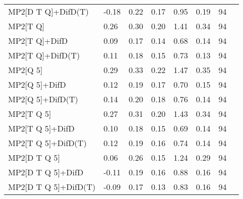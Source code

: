 \begin{table}
\begin{tabular}{l l l l l l l l }
    MP2[D T Q]+DifD(T) & -0.18 & 0.22 & 0.17 & 0.95 & 0.19 & 94 \\ 
    MP2[T Q] & 0.26 & 0.30 & 0.20 & 1.41 & 0.34 & 94 \\ 
    MP2[T Q]+DifD & 0.09 & 0.17 & 0.14 & 0.68 & 0.14 & 94 \\ 
    MP2[T Q]+DifD(T) & 0.11 & 0.18 & 0.15 & 0.73 & 0.13 & 94 \\ 
    MP2[Q 5] & 0.29 & 0.33 & 0.22 & 1.47 & 0.35 & 94 \\ 
    MP2[Q 5]+DifD & 0.12 & 0.19 & 0.17 & 0.70 & 0.15 & 94 \\ 
    MP2[Q 5]+DifD(T) & 0.14 & 0.20 & 0.18 & 0.76 & 0.14 & 94 \\ 
    MP2[T Q 5] & 0.27 & 0.31 & 0.20 & 1.43 & 0.34 & 94 \\ 
    MP2[T Q 5]+DifD & 0.10 & 0.18 & 0.15 & 0.69 & 0.14 & 94 \\ 
    MP2[T Q 5]+DifD(T) & 0.12 & 0.19 & 0.16 & 0.74 & 0.14 & 94 \\ 
    MP2[D T Q 5] & 0.06 & 0.26 & 0.15 & 1.24 & 0.29 & 94 \\ 
    MP2[D T Q 5]+DifD & -0.11 & 0.19 & 0.16 & 0.88 & 0.16 & 94 \\ 
    MP2[D T Q 5]+DifD(T) & -0.09 & 0.17 & 0.13 & 0.83 & 0.16 & 94 \\ 
    \bottomrule
  \end{tabular}
\end{table}
